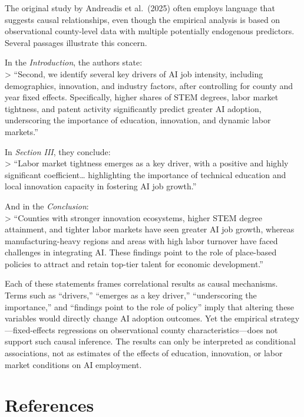 \documentclass[
]{article}
\begin{document}
The original study by Andreadis et al.~(2025) often employs language
that suggests causal relationships, even though the empirical analysis
is based on observational county-level data with multiple potentially
endogenous predictors. Several passages illustrate this concern.

In the \emph{Introduction}, the authors state:\\
\textgreater{} ``Second, we identify several key drivers of AI job
intensity, including demographics, innovation, and industry factors,
after controlling for county and year fixed effects. Specifically,
higher shares of STEM degrees, labor market tightness, and patent
activity significantly predict greater AI adoption, underscoring the
importance of education, innovation, and dynamic labor markets.''

In \emph{Section III}, they conclude:\\
\textgreater{} ``Labor market tightness emerges as a key driver, with a
positive and highly significant coefficient\ldots{} highlighting the
importance of technical education and local innovation capacity in
fostering AI job growth.''

And in the \emph{Conclusion}:\\
\textgreater{} ``Counties with stronger innovation ecosystems, higher
STEM degree attainment, and tighter labor markets have seen greater AI
job growth, whereas manufacturing-heavy regions and areas with high
labor turnover have faced challenges in integrating AI. These findings
point to the role of place-based policies to attract and retain top-tier
talent for economic development.''

Each of these statements frames correlational results as causal
mechanisms. Terms such as ``drivers,'' ``emerges as a key driver,''
``underscoring the importance,'' and ``findings point to the role of
policy'' imply that altering these variables would directly change AI
adoption outcomes. Yet the empirical strategy---fixed-effects
regressions on observational county characteristics---does not support
such causal inference. The results can only be interpreted as
conditional associations, not as estimates of the effects of education,
innovation, or labor market conditions on AI employment.

\section*{References}\label{references}
\end{document}
